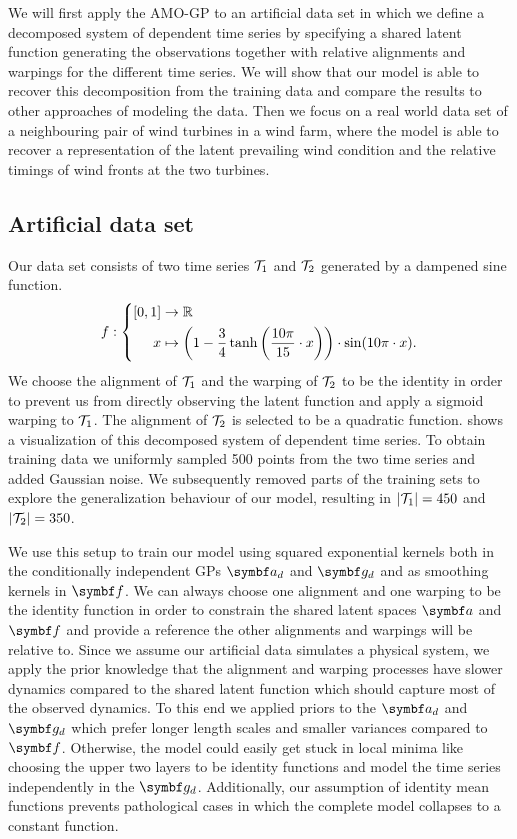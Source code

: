 We will first apply the AMO-GP to an artificial data set in which we define a decomposed system of dependent time series by specifying a shared latent function generating the observations together with relative alignments and warpings for the different time series.
We will show that our model is able to recover this decomposition from the training data and compare the results to other approaches of modeling the data.
Then we focus on a real world data set of a neighbouring pair of wind turbines in a wind farm, where the model is able to recover a representation of the latent prevailing wind condition and the relative timings of wind fronts at the two turbines.

\subsection{Artificial data set}
\label{sub:timeseries_alignment:artificial_example}
Our data set consists of two time series $\mathcal{T}_1$ and $\mathcal{T}_2$ generated by a dampened sine function.
\begin{align}
    f : \left\{ \begin{aligned}
        [0, 1] &\to \Rb \\
        x &\mapsto \left( 1 - \frac{3}{4} \tanh \left( \frac{10\pi}{15} \cdot x \right) \right) \cdot \sin (10\pi \cdot x).
        \end{aligned}\right.
\end{align}
We choose the alignment of $\mathcal{T}_1$ and the warping of $\mathcal{T}_2$ to be the identity in order to prevent us from directly observing the latent function and apply a sigmoid warping to $\mathcal{T}_1$.
The alignment of $\mathcal{T}_2$ is selected to be a quadratic function.
 shows a visualization of this decomposed system of dependent time series.
To obtain training data we uniformly sampled 500 points from the two time series and added Gaussian noise.
We subsequently removed parts of the training sets to explore the generalization behaviour of our model, resulting in $\vert\mathcal{T}_1\vert= 450$ and $\vert\mathcal{T}_2\vert = 350$.

We use this setup to train our model using squared exponential kernels both in the conditionally independent GPs $\rv{a_d}$ and $\rv{g_d}$ and as smoothing kernels in $\rv{f}$.
We can always choose one alignment and one warping to be the identity function in order to constrain the shared latent spaces $\rv{a}$ and $\rv{f}$ and provide a reference the other alignments and warpings will be relative to.
Since we assume our artificial data simulates a physical system, we apply the prior knowledge that the alignment and warping processes have slower dynamics compared to the shared latent function which should capture most of the observed dynamics.
To this end we applied priors to the $\rv{a_d}$ and $\rv{g_d}$ which prefer longer length scales and smaller variances compared to $\rv{f}$.
Otherwise, the model could easily get stuck in local minima like choosing the upper two layers to be identity functions and model the time series independently in the $\rv{g_d}$.
Additionally, our assumption of identity mean functions prevents pathological cases in which the complete model collapses to a constant function.

